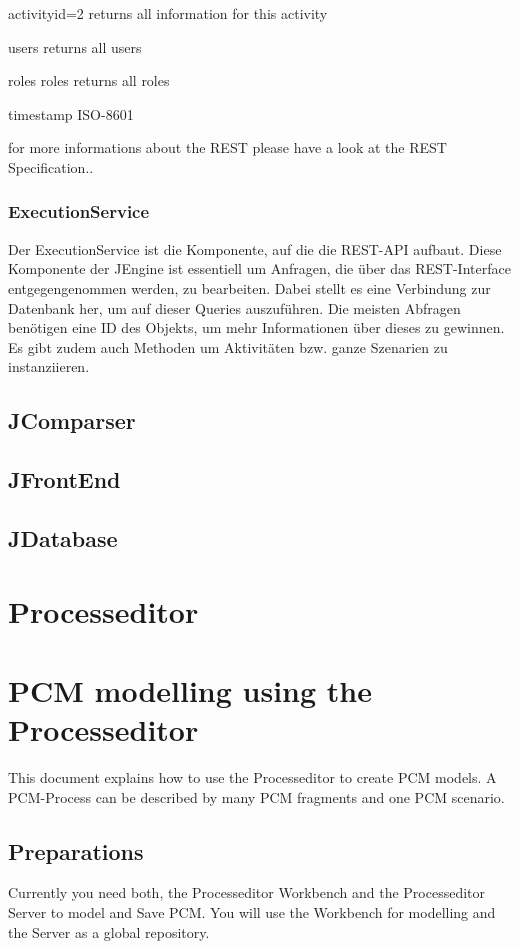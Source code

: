 \documentclass{article}
\begin{document}
activityid=2
returns all information for this activity

users
returns all users

roles
roles returns all roles


timestamp ISO-8601

for more informations about the REST please have a look at the REST Specification..

%
%
\subsubsection{ExecutionService}
Der ExecutionService ist die Komponente, auf die die REST-API aufbaut. Diese Komponente der JEngine ist essentiell um Anfragen, die über das REST-Interface entgegengenommen werden, zu bearbeiten. Dabei stellt es eine Verbindung zur Datenbank her, um auf dieser Queries auszuführen. Die meisten Abfragen benötigen eine ID des Objekts, um mehr Informationen über dieses zu gewinnen. Es gibt zudem auch Methoden um Aktivitäten bzw. ganze Szenarien zu instanziieren.

%
%
\subsection{JComparser}

%
%
\subsection{JFrontEnd}

%
%
\subsection{JDatabase}

%
%
\section{Processeditor}

%
%
\section{PCM modelling using the Processeditor}
\label{pcm-modelling-using-the-processeditor}
This document explains how to use the Processeditor to create PCM models. A PCM-Process can be described by many PCM fragments and one PCM scenario.

%
%
\subsection{Preparations}
\label{preparations}
Currently you need both, the Processeditor Workbench and the Processeditor Server to model and Save PCM. You will use the Workbench for modelling and the Server as a global repository.
\end{document}
